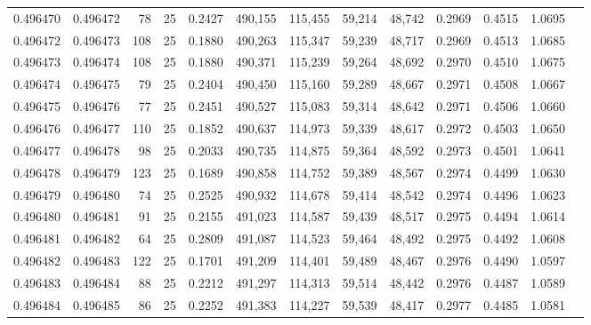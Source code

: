 \begin{tabular}{rrrrrrrrrrrrr}
0.496470 & 0.496472 &    78 &  25 &                                     0.2427 & 490,155 & 115,455 &  59,214 &  48,742 & 0.2969 & 0.4515 & 1.0695 \\
0.496472 & 0.496473 &   108 &  25 &                                     0.1880 & 490,263 & 115,347 &  59,239 &  48,717 & 0.2969 & 0.4513 & 1.0685 \\
0.496473 & 0.496474 &   108 &  25 &                                     0.1880 & 490,371 & 115,239 &  59,264 &  48,692 & 0.2970 & 0.4510 & 1.0675 \\
0.496474 & 0.496475 &    79 &  25 &                                     0.2404 & 490,450 & 115,160 &  59,289 &  48,667 & 0.2971 & 0.4508 & 1.0667 \\
0.496475 & 0.496476 &    77 &  25 &                                     0.2451 & 490,527 & 115,083 &  59,314 &  48,642 & 0.2971 & 0.4506 & 1.0660 \\
0.496476 & 0.496477 &   110 &  25 &                                     0.1852 & 490,637 & 114,973 &  59,339 &  48,617 & 0.2972 & 0.4503 & 1.0650 \\
0.496477 & 0.496478 &    98 &  25 &                                     0.2033 & 490,735 & 114,875 &  59,364 &  48,592 & 0.2973 & 0.4501 & 1.0641 \\
0.496478 & 0.496479 &   123 &  25 &                                     0.1689 & 490,858 & 114,752 &  59,389 &  48,567 & 0.2974 & 0.4499 & 1.0630 \\
0.496479 & 0.496480 &    74 &  25 &                                     0.2525 & 490,932 & 114,678 &  59,414 &  48,542 & 0.2974 & 0.4496 & 1.0623 \\
0.496480 & 0.496481 &    91 &  25 &                                     0.2155 & 491,023 & 114,587 &  59,439 &  48,517 & 0.2975 & 0.4494 & 1.0614 \\
0.496481 & 0.496482 &    64 &  25 &                                     0.2809 & 491,087 & 114,523 &  59,464 &  48,492 & 0.2975 & 0.4492 & 1.0608 \\
0.496482 & 0.496483 &   122 &  25 &                                     0.1701 & 491,209 & 114,401 &  59,489 &  48,467 & 0.2976 & 0.4490 & 1.0597 \\
0.496483 & 0.496484 &    88 &  25 &                                     0.2212 & 491,297 & 114,313 &  59,514 &  48,442 & 0.2976 & 0.4487 & 1.0589 \\
0.496484 & 0.496485 &    86 &  25 &                                     0.2252 & 491,383 & 114,227 &  59,539 &  48,417 & 0.2977 & 0.4485 & 1.0581 \\

\end{tabular}
